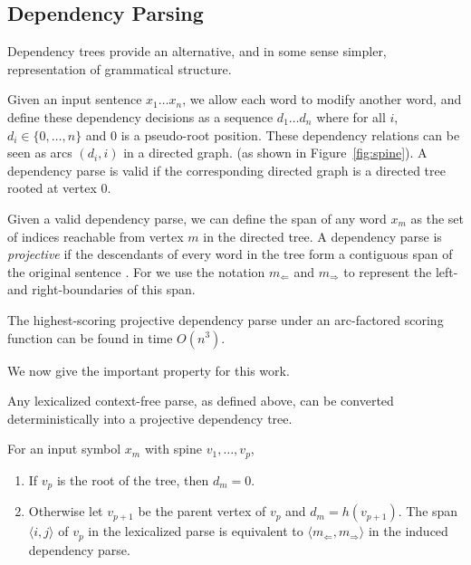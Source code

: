 \documentclass[11pt,letterpaper]{article}
\newcommand{\Left}[1]{#1_{\Leftarrow}}
\newcommand{\Right}[1]{#1_{\Rightarrow}}
\newcommand{\Span}[1]{\langle #1 \rangle}
\begin{document}
\subsection{Dependency Parsing}

Dependency trees provide an alternative, and in some sense simpler,
representation of grammatical structure.

Given an input sentence $x_1
\ldots x_n$, we allow each word to modify another word,  and define these dependency decisions as a sequence $d_1 \ldots d_n$ where for all $i$, $d_i \in \{0, \ldots, n\}$ and $0$ is a pseudo-root position. These dependency relations can be seen as arcs $(d_i, i)$ in a directed graph. (as
shown in Figure~\ref{fig:spine}). A dependency parse is valid  if the corresponding directed graph is a directed tree rooted at
vertex $0$.

Given a valid dependency parse, we can define the span of any word $x_m$ as the set of indices reachable from vertex $m$ in the directed tree. A dependency parse is \textit{projective} if the descendants of every word in the tree form a contiguous span of the original sentence \cite{}. For we use the notation $\Left{m}$ and $\Right{m}$ to represent the left- and
right-boundaries of this span.

The highest-scoring projective dependency parse under an arc-factored scoring function can be found in time $O(n^3)$.







We now give the important property for this work.

Any lexicalized context-free parse, as defined above, can be converted
deterministically into a projective dependency tree.


For an input symbol $x_m$ with spine $v_1, \ldots, v_p$,

\begin{enumerate}
\item If $v_p$ is the root of the tree,
then $d_m = 0$.
\item Otherwise let $v_{p+1}$ be the parent vertex of
$v_p$ and $d_m = h(v_{p+1})$. The span $\Span{i, j}$ of $v_p$ in the lexicalized parse is equivalent to $\Span{\Left{m}, \Right{m}}$
in the induced dependency parse.
\end{enumerate}
\end{document}
